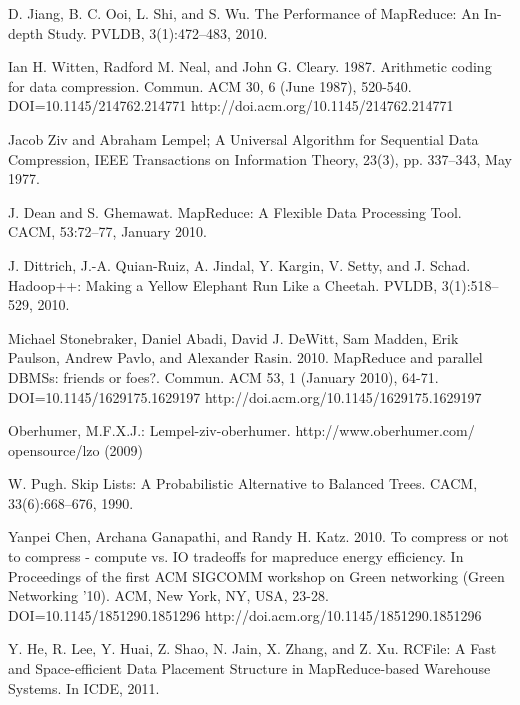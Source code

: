 \documentclass[twocolumn]{article}
\begin{document}
{\begin{thebibliography}{10}
 D. Jiang, B. C. Ooi, L. Shi, and S. Wu. The Performance of
                MapReduce: An In-depth Study. PVLDB, 3(1):472–483,
                2010.

 Ian H. Witten, Radford M. Neal, and John G. Cleary. 1987.
                Arithmetic coding for data compression. Commun.
                ACM 30, 6 (June 1987), 520-540. DOI=10.1145/214762.214771
                http://doi.acm.org/10.1145/214762.214771

 Jacob Ziv and Abraham Lempel; A Universal Algorithm for Sequential
        	Data Compression, IEEE Transactions on Information Theory,
        	23(3), pp. 337–343, May 1977.

 J. Dean and S. Ghemawat. MapReduce: A Flexible Data
                Processing Tool. CACM, 53:72–77, January 2010.

 J. Dittrich, J.-A. Quian-Ruiz, A. Jindal, Y. Kargin,
                V. Setty, and J. Schad. Hadoop++: Making a Yellow
                Elephant Run Like a Cheetah. PVLDB, 3(1):518–529, 2010.\

 Michael Stonebraker, Daniel Abadi, David J. DeWitt, Sam Madden,
                Erik Paulson, Andrew Pavlo, and Alexander Rasin. 2010.
                MapReduce and parallel DBMSs: friends or foes?. Commun.
                ACM 53, 1 (January 2010), 64-71. DOI=10.1145/1629175.1629197
                http://doi.acm.org/10.1145/1629175.1629197

 Oberhumer, M.F.X.J.: Lempel-ziv-oberhumer. http://www.oberhumer.com/
		opensource/lzo (2009)

 W. Pugh. Skip Lists: A Probabilistic Alternative to
        	Balanced Trees. CACM, 33(6):668–676, 1990.

 Yanpei Chen, Archana Ganapathi, and Randy H. Katz. 2010. To compress
                or not to compress - compute vs. IO tradeoffs for mapreduce
                energy efficiency. In Proceedings of the first ACM SIGCOMM
                workshop on Green networking (Green Networking '10). ACM,
                New York, NY, USA, 23-28. DOI=10.1145/1851290.1851296
                http://doi.acm.org/10.1145/1851290.1851296

 Y. He, R. Lee, Y. Huai, Z. Shao, N. Jain, X. Zhang, and
        	Z. Xu. RCFile: A Fast and Space-efficient Data Placement
        	Structure in MapReduce-based Warehouse Systems. In ICDE, 2011.


\end{thebibliography}}
\end{document}
